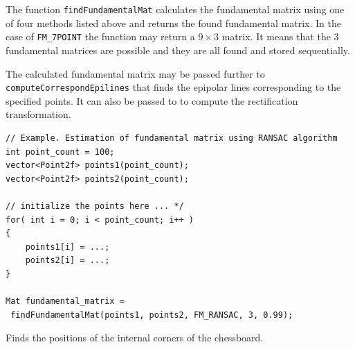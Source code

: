 The function \texttt{findFundamentalMat} calculates the fundamental
matrix using one of four methods listed above and returns the found fundamental matrix. In the case of \texttt{FM\_7POINT} the function may return a $9 \times 3$ matrix. It means that the 3 fundamental matrices are possible and they are all found and stored sequentially.

The calculated fundamental matrix may be passed further to
\texttt{computeCorrespondEpilines} that finds the epipolar lines
corresponding to the specified points. It can also be passed to  to compute the rectification transformation.

\begin{lstlisting}
// Example. Estimation of fundamental matrix using RANSAC algorithm
int point_count = 100;
vector<Point2f> points1(point_count);
vector<Point2f> points2(point_count);

// initialize the points here ... */
for( int i = 0; i < point_count; i++ )
{
    points1[i] = ...;
    points2[i] = ...;
}

Mat fundamental_matrix =
 findFundamentalMat(points1, points2, FM_RANSAC, 3, 0.99);
\end{lstlisting}


\label{findChessboardCorners}
Finds the positions of the internal corners of the chessboard.

